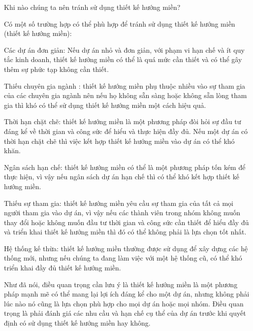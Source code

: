 Khi nào chúng ta nên tránh sử dụng thiết kế hướng miền?

Có một số trường hợp có thể phù hợp để tránh sử dụng thiết kế hướng miền (thiết kế hướng miền):

Các dự án đơn giản: Nếu dự án nhỏ và đơn giản, với phạm vi hạn chế và ít quy tắc kinh doanh, thiết kế hướng miền có thể là quá mức cần thiết và có thể gây thêm sự phức tạp không cần thiết.

Thiếu chuyên gia ngành : thiết kế hướng miền phụ thuộc nhiều vào sự tham gia của các chuyên gia ngành nên nếu họ không sẵn sàng hoặc không sẵn lòng tham gia thì khó có thể sử dụng thiết kế hướng miền một cách hiệu quả.

Thời hạn chặt chẽ: thiết kế hướng miền là một phương pháp đòi hỏi sự đầu tư đáng kể về thời gian và công sức để hiểu và thực hiện đầy đủ. Nếu một dự án có thời hạn chặt chẽ thì việc kết hợp thiết kế hướng miền vào dự án có thể khó khăn.

Ngân sách hạn chế: thiết kế hướng miền có thể là một phương pháp tốn kém để thực hiện, vì vậy nếu ngân sách dự án hạn chế thì có thể khó kết hợp thiết kế hướng miền.

Thiếu sự tham gia: thiết kế hướng miền yêu cầu sự tham gia của tất cả mọi người tham gia vào dự án, vì vậy nếu các thành viên trong nhóm không muốn thay đổi hoặc không muốn đầu tư thời gian và công sức cần thiết để hiểu đầy đủ và triển khai thiết kế hướng miền thì đó có thể không phải là lựa chọn tốt nhất.

Hệ thống kế thừa: thiết kế hướng miền thường được sử dụng để xây dựng các hệ thống mới, nhưng nếu chúng ta đang làm việc với một hệ thống cũ, có thể khó triển khai đầy đủ thiết kế hướng miền.

Như đã nói, điều quan trọng cần lưu ý là thiết kế hướng miền là một phương pháp mạnh mẽ có thể mang lại lợi ích đáng kể cho một dự án, nhưng không phải lúc nào nó cũng là lựa chọn phù hợp cho mọi dự án hoặc mọi nhóm. Điều quan trọng là phải đánh giá các nhu cầu và hạn chế cụ thể của dự án trước khi quyết định có sử dụng thiết kế hướng miền hay không.

